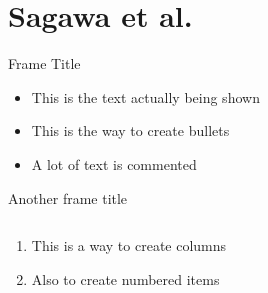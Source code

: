 \section{Sagawa et al.}


\begin{viterbiframe}{{Frame Title}}
\begin{itemize}
\item This is the text actually being shown
\item This is the way to create bullets
\item A lot of text is commented
\end{itemize}
\end{viterbiframe}

\begin{viterbiframe}{Another frame title}

\begin{columns}
\begin{column}{0.7\textwidth}
\begin{enumerate}
\item This is a way to create columns
\item Also to create numbered items
\end{enumerate}
\end{column}
\begin{column}{0.3\textwidth}
\begin{figure}
\centering
\caption{}
\label{fig:overiew_cnn}
\end{figure}
\end{column}
\end{columns}


\end{viterbiframe}
%
